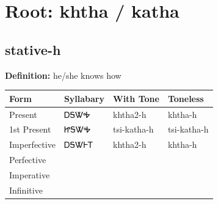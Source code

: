 \documentclass{article}%
\begin{document}
%
\normalsize%
\section*{Root: khtha / katha}%
\subsection*{stative-h}%
\textbf{Definition: }%
he/she knows how%
\\[0.5em]%
\begin{tabular}{|l|l|l|l|}%
\hline%
\textbf{Form}&\textbf{Syllabary}&\textbf{With Tone}&\textbf{Toneless}\\%
\hline%
Present&ᎠᎦᏔᎭ&khtha2{-}h&khtha{-}h\\%
1st Present&ᏥᎦᏔᎭ&tsi{-}katha{-}h&tsi{-}katha{-}h\\%
Imperfective&ᎠᎦᏔᎰᎢ&khtha2{-}h&khtha{-}h\\%
Perfective&&&\\%
Imperative&&&\\%
Infinitive&&&\\%
\hline%
\end{tabular}%
\\[1em]%
\end{document}
